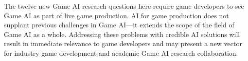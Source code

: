 \documentclass[conference]{IEEEtran}
\begin{document}
The twelve new Game AI research questions here require game developers to see Game AI as part of live game production.
AI for game production does not supplant previous challenges in Game AI---it extends the scope of the field of Game AI as a whole.
Addressing these problems with credible AI solutions will result in immediate relevance to game developers and may present a new vector for industry game development and academic Game AI research collaboration. 


%


%
%
\end{document}
